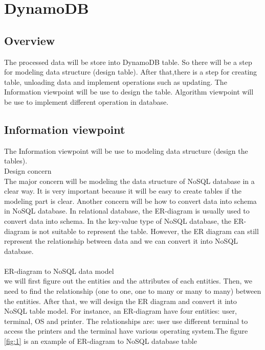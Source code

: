 \section{DynamoDB}
    \subsection{Overview}
    The processed data will be store into DynamoDB table. So there will be a step for modeling data structure (design table). After that,there is a step for creating table, unloading data and implement operations such as updating. The Information viewpoint will be use to design the table. Algorithm viewpoint will be use to implement different operation in database.
    \subsection{Information viewpoint}

    The Information viewpoint will be use to modeling data structure (design the tables).\\
Design concern \\
The major concern will be modeling the data structure of NoSQL database in a clear way. It is very important because it will be easy to create tables if the modeling part is clear. Another concern will be how to convert data into schema in NoSQL database. In relational database, the ER-diagram is usually used to convert data into schema. In the key-value type of NoSQL database, the ER-diagram is not suitable to represent the table. However, the ER diagram can still represent the relationship between data and we can convert it into NoSQL database.\\
\\
ER-diagram to NoSQL data model\\
we will first figure out the entities and the attributes of each entities. Then, we need to find the relationship (one to one, one to many or many to many) between the entities. After that, we will design the ER diagram and convert it into NoSQL table model. For instance, an ER-diagram have four entities: user, terminal, OS and printer. The relationships are: user use different terminal to access the printers and the terminal have various operating system.The figure \ref{fig:1} is an example of ER-diagram to NoSQL database table\\

